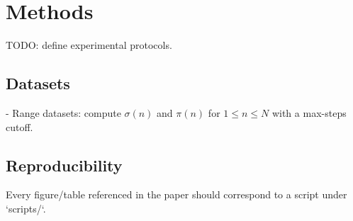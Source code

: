 \section{Methods}\label{sec:methods}

TODO: define experimental protocols.

\subsection{Datasets}
- Range datasets: compute $\sigma(n)$ and $\pi(n)$ for $1\le n\le N$ with a max-steps cutoff.

\subsection{Reproducibility}
Every figure/table referenced in the paper should correspond to a script under `scripts/`.
